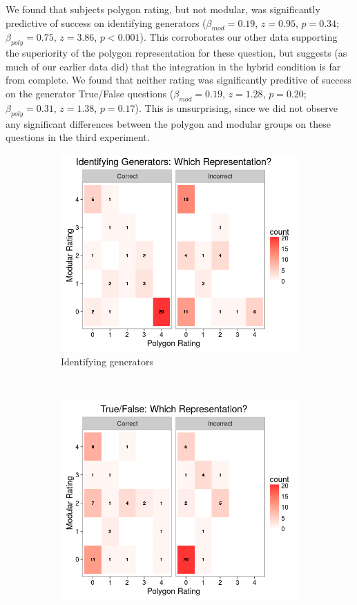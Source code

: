 \documentclass[man,10pt]{apa6}
\begin{document}
We found that subjects polygon rating, but not modular, was significantly predictive of success on identifying generators ($\beta_{mod} = 0.19$, $z = 0.95$, $p = 0.34$; $\beta_{poly} = 0.75$, $z = 3.86$, $p < 0.001$). This corroborates our other data supporting the superiority of the polygon representation for these question, but suggests (as much of our earlier data did) that the integration in the hybrid condition is far from complete. We found that neither rating was significantly preditive of success on the generator True/False questions ($\beta_{mod} = 0.19$, $z = 1.28$, $p = 0.20$; $\beta_{poly} = 0.31$, $z = 1.38$, $p = 0.17$). This is unsurprising, since we did not observe any significant differences between the polygon and modular groups on these questions in the third experiment. 
\begin{figure}
\centering
\begin{subfigure}[c]{0.45\textwidth}
\centering 
\includegraphics[width=\textwidth]{figures/3/wr_genT.png}
\caption{Identifying generators}
\end{subfigure}
~
\begin{subfigure}[c]{0.45\textwidth}
\centering 
\includegraphics[width=\textwidth]{figures/3/wr_genTF.png}

\end{subfigure}
\end{figure}
\end{document}
